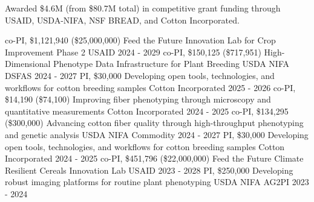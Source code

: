 
\begin{cvgrants}

  \cvsummarytext
    {}
    {Awarded \$4.6M (from \$80.7M total) in competitive grant funding through \\USAID, USDA-NIFA, NSF BREAD, and Cotton Incorporated.}
    
  \leavevmode\newline
  
  \cvgrant
    {co-PI, \$1,121,940 (\$25,000,000)}
    {Feed the Future Innovation Lab for Crop Improvement Phase 2}
    {USAID} %
    {2024 - 2029}
    {
    }
  \cvgrant
    {co-PI, \$150,125 (\$717,951)}
    {High-Dimensional Phenotype Data Infrastructure for Plant Breeding}
    {USDA NIFA DSFAS} %
    {2024 - 2027}
    {
    }
  \cvgrant
    {PI, \$30,000}
    {Developing open tools, technologies, and workflows for cotton breeding samples}
    {Cotton Incorporated} %
    {2025 - 2026}
    {
    }
  \cvgrant
    {co-PI, \$14,190 (\$74,100)}
    {Improving fiber phenotyping through microscopy and quantitative measurements}
    {Cotton Incorporated} %
    {2024 - 2025}
    {
    }
  \cvgrant
    {co-PI, \$134,295 (\$300,000)}
    {Advancing cotton fiber quality through high-throughput phenotyping and genetic analysis}
    {USDA NIFA Commodity} %
    {2024 - 2027}
    {
    }
  \cvgrant
    {PI, \$30,000}
    {Developing open tools, technologies, and workflows for cotton breeding samples}
    {Cotton Incorporated} %
    {2024 - 2025}
    {
    }
  \cvgrant
    {co-PI, \$451,796 (\$22,000,000)}
    {Feed the Future Climate Resilient Cereals Innovation Lab}
    {USAID} %
    {2023 - 2028}
    {
    }
  \cvgrant
    {PI, \$250,000}
    {Developing robust imaging platforms for routine plant phenotyping}
    {USDA NIFA AG2PI} %
    {2023 - 2024}
    {
    }

\end{cvgrants}
